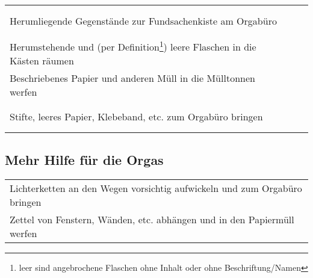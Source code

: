 \documentclass[14pt,parskip=full+]{scrartcl}
\newcommand{\checkfield}{~ \hfill ~\raisebox{-5pt}{\tikz\node[draw,minimum width=16.8pt,minimum height=16.8pt]{};}}
\begin{document}

\def\arraystretch{1.3}

\begin{tabularx}{\textwidth}{Xc}
 Herumliegende Gegenstände zur Fundsachenkiste am Orgabüro & \checkfield \\
 Herumstehende und (per Definition\footnote{leer sind angebrochene Flaschen ohne Inhalt oder ohne Beschriftung/Namen}) leere Flaschen in die Kästen räumen & \checkfield \\
 Beschriebenes Papier und anderen Müll in die Mülltonnen werfen & \checkfield \\
 Stifte, leeres Papier, Klebeband, etc. zum Orgabüro bringen & \checkfield \\
\end{tabularx}

\subsection*{Mehr Hilfe für die Orgas}
\begin{tabularx}{\textwidth}{X}
 Lichterketten an den Wegen vorsichtig aufwickeln und zum Orgabüro bringen \\
 Zettel von Fenstern, Wänden, etc. abhängen und in den Papiermüll werfen \\
\end{tabularx}
\end{document}
